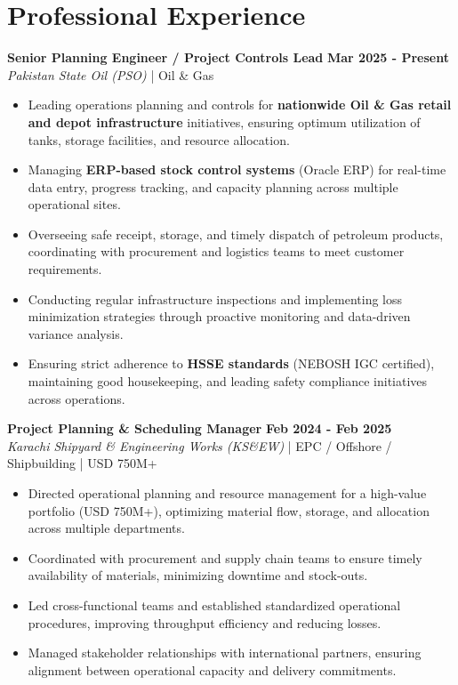 \documentclass[11pt,a4paper]{article}
\begin{document}
\section{Professional Experience}
\noindent \textbf{\large Senior Planning Engineer / Project Controls Lead} \hfill \textbf{\color{awesome-blue}Mar 2025 - Present}\\
\textit{Pakistan State Oil (PSO)} | Oil \& Gas\\
\begin{itemize}
    \item Leading operations planning and controls for \textbf{nationwide Oil \& Gas retail and depot infrastructure} initiatives, ensuring optimum utilization of tanks, storage facilities, and resource allocation.
    \item Managing \textbf{ERP-based stock control systems} (Oracle ERP) for real-time data entry, progress tracking, and capacity planning across multiple operational sites.
    \item Overseeing safe receipt, storage, and timely dispatch of petroleum products, coordinating with procurement and logistics teams to meet customer requirements.
    \item Conducting regular infrastructure inspections and implementing loss minimization strategies through proactive monitoring and data-driven variance analysis.
    \item Ensuring strict adherence to \textbf{HSSE standards} (NEBOSH IGC certified), maintaining good housekeeping, and leading safety compliance initiatives across operations.
\end{itemize}

\noindent \textbf{\large Project Planning \& Scheduling Manager} \hfill \textbf{\color{awesome-blue}Feb 2024 - Feb 2025}\\
\textit{Karachi Shipyard \& Engineering Works (KS\&EW)} | EPC / Offshore / Shipbuilding | USD 750M+\\
\begin{itemize}
    \item Directed operational planning and resource management for a high-value portfolio (USD 750M+), optimizing material flow, storage, and allocation across multiple departments.
    \item Coordinated with procurement and supply chain teams to ensure timely availability of materials, minimizing downtime and stock-outs.
    \item Led cross-functional teams and established standardized operational procedures, improving throughput efficiency and reducing losses.
    \item Managed stakeholder relationships with international partners, ensuring alignment between operational capacity and delivery commitments.
\end{itemize}
\end{document}
